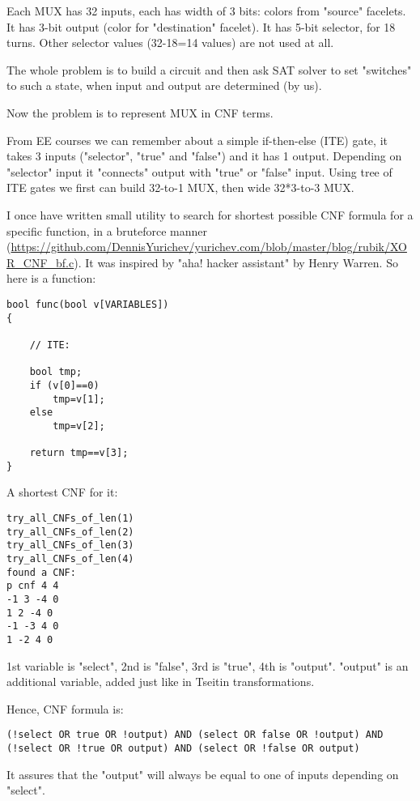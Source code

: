 Each MUX has 32 inputs, each has width of 3 bits: colors from "source" facelets.
It has 3-bit output (color for "destination" facelet).
It has 5-bit selector, for 18 turns. Other selector values (32-18=14 values) are not used at all.

The whole problem is to build a circuit and then ask SAT solver to set "switches" to such a state,
when input and output are determined (by us).

Now the problem is to represent MUX in CNF terms.

From \ac{EE} courses we can remember about a simple if-then-else (ITE) gate, it takes 3 inputs
("selector", "true" and "false") and it has 1 output.
Depending on "selector" input it "connects" output with "true" or "false" input.
Using tree of ITE gates we first can build 32-to-1 MUX, then wide 32*3-to-3 MUX.

I once have written small utility to search for shortest possible CNF formula for a specific function,
in a bruteforce manner (\url{https://github.com/DennisYurichev/yurichev.com/blob/master/blog/rubik/XOR_CNF_bf.c}).
It was inspired by "aha! hacker assistant" by Henry Warren.
So here is a function:

\begin{lstlisting}
bool func(bool v[VARIABLES])
{

	// ITE:

	bool tmp;
	if (v[0]==0)
		tmp=v[1];
	else
		tmp=v[2];

	return tmp==v[3];
}
\end{lstlisting}

A shortest CNF for it:

\begin{lstlisting}
try_all_CNFs_of_len(1)
try_all_CNFs_of_len(2)
try_all_CNFs_of_len(3)
try_all_CNFs_of_len(4)
found a CNF:
p cnf 4 4
-1 3 -4 0
1 2 -4 0
-1 -3 4 0
1 -2 4 0
\end{lstlisting}

1st variable is "select", 2nd is "false", 3rd is "true", 4th is "output".
"output" is an additional variable, added just like in Tseitin transformations.

Hence, CNF formula is:

\begin{lstlisting}
(!select OR true OR !output) AND (select OR false OR !output) AND (!select OR !true OR output) AND (select OR !false OR output)
\end{lstlisting}

It assures that the "output" will always be equal to one of inputs depending on "select".

